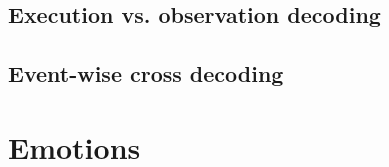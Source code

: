 \documentclass[a4,12pt]{ozu-thesis}
\begin{document}
\subsection{Execution vs. observation decoding}


\subsection{Event-wise cross decoding}


\section{Emotions}





\begin{thebibliography}{99}


\end{thebibliography}


\appendix



\begin{postliminary}
\end{postliminary}
\end{document}
